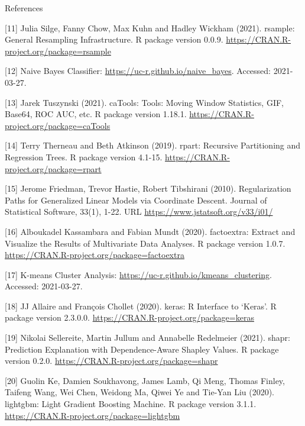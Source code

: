 \documentclass[12pt,ignorenonframetext,]{beamer}
\begin{document}
\begin{frame}{References}
\protect\hypertarget{references-1}{}

\tiny

{[}11{]} Julia Silge, Fanny Chow, Max Kuhn and Hadley Wickham (2021).
rsample: General Resampling Infrastructure. R package version 0.0.9.
\url{https://CRAN.R-project.org/package=rsample}

{[}12{]} Naive Bayes Classifier:
\url{https://uc-r.github.io/naive_bayes}. Accessed: 2021-03-27.

{[}13{]} Jarek Tuszynski (2021). caTools: Tools: Moving Window
Statistics, GIF, Base64, ROC AUC, etc. R package version 1.18.1.
\url{https://CRAN.R-project.org/package=caTools}

{[}14{]} Terry Therneau and Beth Atkinson (2019). rpart: Recursive
Partitioning and Regression Trees. R package version 4.1-15.
\url{https://CRAN.R-project.org/package=rpart}

{[}15{]} Jerome Friedman, Trevor Hastie, Robert Tibshirani (2010).
Regularization Paths for Generalized Linear Models via Coordinate
Descent. Journal of Statistical Software, 33(1), 1-22. URL
\url{https://www.jstatsoft.org/v33/i01/}

{[}16{]} Alboukadel Kassambara and Fabian Mundt (2020). factoextra:
Extract and Visualize the Results of Multivariate Data Analyses. R
package version 1.0.7.
\url{https://CRAN.R-project.org/package=factoextra}

{[}17{]} K-means Cluster Analysis:
\url{https://uc-r.github.io/kmeans_clustering}. Accessed: 2021-03-27.

{[}18{]} JJ Allaire and François Chollet (2020). keras: R Interface to
`Keras'. R package version 2.3.0.0.
\url{https://CRAN.R-project.org/package=keras}

{[}19{]} Nikolai Sellereite, Martin Jullum and Annabelle Redelmeier
(2021). shapr: Prediction Explanation with Dependence-Aware Shapley
Values. R package version 0.2.0.
\url{https://CRAN.R-project.org/package=shapr}

{[}20{]} Guolin Ke, Damien Soukhavong, James Lamb, Qi Meng, Thomas
Finley, Taifeng Wang, Wei Chen, Weidong Ma, Qiwei Ye and Tie-Yan Liu
(2020). lightgbm: Light Gradient Boosting Machine. R package version
3.1.1. \url{https://CRAN.R-project.org/package=lightgbm}

\end{frame}
\end{document}
